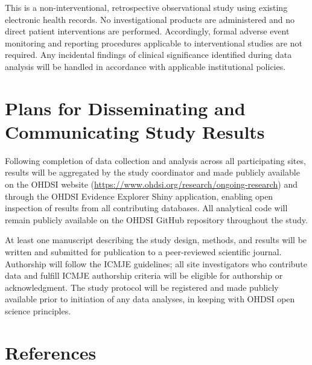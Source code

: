 \documentclass[
  12pt,
]{article}
\begin{document}
This is a non-interventional, retrospective observational study using
existing electronic health records. No investigational products are
administered and no direct patient interventions are performed.
Accordingly, formal adverse event monitoring and reporting procedures
applicable to interventional studies are not required. Any incidental
findings of clinical significance identified during data analysis will
be handled in accordance with applicable institutional policies.

\section{Plans for Disseminating and Communicating Study
Results}\label{plans-for-disseminating-and-communicating-study-results}

Following completion of data collection and analysis across all
participating sites, results will be aggregated by the study coordinator
and made publicly available on the OHDSI website
(\url{https://www.ohdsi.org/research/ongoing-research}) and through the
OHDSI Evidence Explorer Shiny application, enabling open inspection of
results from all contributing databases. All analytical code will remain
publicly available on the OHDSI GitHub repository throughout the study.

At least one manuscript describing the study design, methods, and
results will be written and submitted for publication to a peer-reviewed
scientific journal. Authorship will follow the ICMJE guidelines; all
site investigators who contribute data and fulfill ICMJE authorship
criteria will be eligible for authorship or acknowledgment. The study
protocol will be registered and made publicly available prior to
initiation of any data analyses, in keeping with OHDSI open science
principles.

\clearpage

\section*{References}\label{references}
\end{document}

